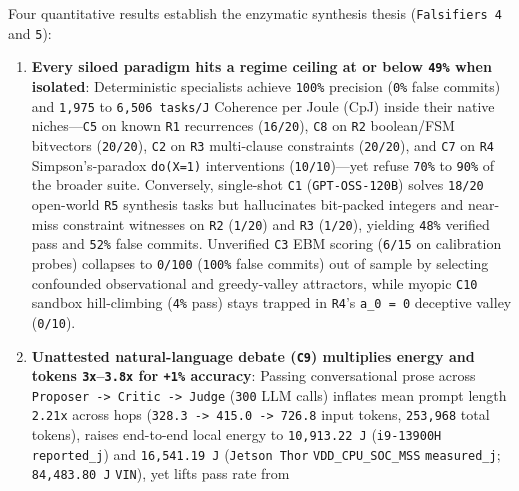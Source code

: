 \documentclass[10pt,letterpaper]{article}
\providecommand{\tightlist}{\setlength{\itemsep}{1pt}\setlength{\parskip}{0pt}}
\begin{document}
Four quantitative results establish the enzymatic synthesis thesis
(\texttt{Falsifiers\ 4} and \texttt{5}):

\begin{enumerate}
\def\labelenumi{\arabic{enumi}.}
\tightlist
\item
  \textbf{Every siloed paradigm hits a regime ceiling at or below
  \texttt{49\%} when isolated}: Deterministic specialists achieve
  \texttt{100\%} precision (\texttt{0\%} false commits) and
  \texttt{1,975} to \texttt{6,\allowbreak{}506\ tasks/\allowbreak{}J} Coherence per Joule (CpJ)
  inside their native niches---\texttt{C5} on known \texttt{R1}
  recurrences (\texttt{16/20}), \texttt{C8} on \texttt{R2} boolean/FSM
  bitvectors (\texttt{20/20}), \texttt{C2} on \texttt{R3} multi-clause
  constraints (\texttt{20/20}), and \texttt{C7} on \texttt{R4}
  Simpson's-paradox \texttt{do(X=1)} interventions
  (\texttt{10/10})---yet refuse \texttt{70\%} to \texttt{90\%} of the
  broader suite. Conversely, single-shot \texttt{C1}
  (\texttt{GPT-\allowbreak{}OSS-\allowbreak{}120B}) solves \texttt{18/20} open-world \texttt{R5}
  synthesis tasks but hallucinates bit-packed integers and near-miss
  constraint witnesses on \texttt{R2} (\texttt{1/20}) and \texttt{R3}
  (\texttt{1/20}), yielding \texttt{48\%} verified pass and
  \texttt{52\%} false commits. Unverified \texttt{C3} EBM scoring
  (\texttt{6/15} on calibration probes) collapses to \texttt{0/100}
  (\texttt{100\%} false commits) out of sample by selecting confounded
  observational and greedy-valley attractors, while myopic \texttt{C10}
  sandbox hill-climbing (\texttt{4\%} pass) stays trapped in
  \texttt{R4}'s \texttt{a\_\allowbreak{}0\ =\ 0} deceptive valley (\texttt{0/10}).
\item
  \textbf{Unattested natural-language debate (\texttt{C9}) multiplies
  energy and tokens \texttt{3x}--\texttt{3.8x} for \texttt{+1\%}
  accuracy}: Passing conversational prose across
  \texttt{Proposer\ -\textgreater{}\ Critic\ -\textgreater{}\ Judge}
  (\texttt{300} LLM calls) inflates mean prompt length \texttt{2.21x}
  across hops
  (\texttt{328.3\ -\textgreater{}\ 415.0\ -\textgreater{}\ 726.8} input
  tokens, \texttt{253,968} total tokens), raises end-to-end local energy
  to \texttt{10,\allowbreak{}913.\allowbreak{}22\ J} (\texttt{i9-13900H} \texttt{reported\_\allowbreak{}j}) and
  \texttt{16,\allowbreak{}541.\allowbreak{}19\ J} (\texttt{Jetson\ Thor}
  \texttt{VDD\_\allowbreak{}CPU\_\allowbreak{}SOC\_\allowbreak{}MSS} \texttt{measured\_\allowbreak{}j};
  \texttt{84,\allowbreak{}483.\allowbreak{}80\ J} \texttt{VIN}), yet lifts pass rate from

\end{enumerate}
\end{document}
